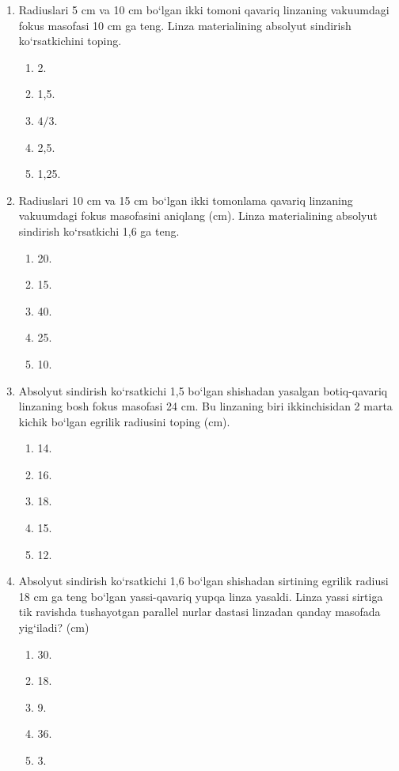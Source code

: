 \begin{enumerate}
\item Radiuslari 5 cm va 10 cm bo‘lgan ikki tomoni qavariq linzaning vakuumdagi fokus masofasi 10 cm ga teng. Linza materialining absolyut sindirish ko‘rsatkichini toping.
\begin{enumerate}[label=\Alph*)]
\item 2.
\item 1,5.
\item $4/3$.
\item 2,5.
\item 1,25.
\end{enumerate}


\item Radiuslari 10 cm va 15 cm bo‘lgan ikki tomonlama qavariq linzaning vakuumdagi fokus masofasini aniqlang (cm). Linza materialining absolyut sindirish ko‘rsatkichi 1,6 ga teng.
\begin{enumerate}[label=\Alph*)]
\item 20.
\item 15.
\item 40.
\item 25.
\item 10.
\end{enumerate}

\item Absolyut sindirish ko‘rsatkichi 1,5 bo‘lgan shishadan yasalgan botiq-qavariq linzaning bosh fokus masofasi 24 cm. Bu linzaning biri ikkinchisidan 2 marta kichik bo‘lgan egrilik radiusini toping (cm).
\begin{enumerate}[label=\Alph*)]
\item 14.
\item 16.
\item 18.
\item 15.
\item 12.
\end{enumerate}

\item Absolyut sindirish ko‘rsatkichi 1,6 bo‘lgan shishadan sirtining egrilik radiusi 18 cm ga teng bo‘lgan yassi-qavariq yupqa linza yasaldi. Linza yassi sirtiga tik ravishda tushayotgan parallel nurlar dastasi linzadan qanday masofada yig‘iladi? (cm)
\begin{enumerate}[label=\Alph*)]
\item 30.
\item 18.
\item 9.
\item 36.
\item 3.
\end{enumerate}


\end{enumerate}

